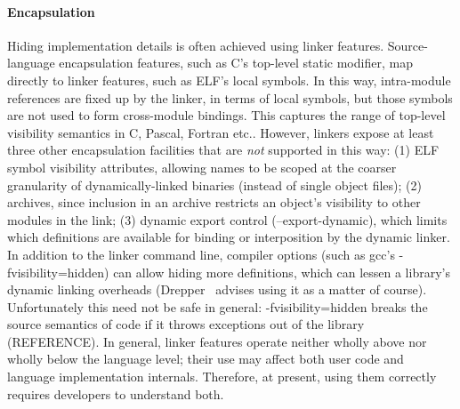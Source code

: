 
\paragraph{Encapsulation}
Hiding implementation details is often achieved using linker features. 
Source-language encapsulation features, such as C's top-level \textsf{static} modifier, 
map directly to linker features, such as ELF's local symbols.
In this way, intra-module references are fixed up by the linker, in terms of local symbols, 
but those symbols are not used to form cross-module bindings.
This captures the range of top-level visibility semantics in C, Pascal, Fortran etc..
However, linkers expose at least three other encapsulation facilities
that are \emph{not} supported in this way: (1) ELF symbol visibility attributes,
allowing names to be scoped at the coarser granularity of 
dynamically-linked binaries (instead of single object files);
(2) archives,
since inclusion in an archive restricts an object's visibility 
to other modules in the link;
(3) dynamic export control (\textsf{--export-dynamic}), which limits 
which definitions are available for binding or interposition by the dynamic linker.
In addition to the linker command line, 
compiler options (such as \textsf{gcc}'s \textsf{-fvisibility=hidden})
can allow hiding more definitions,
which can lessen a library's dynamic linking overheads
(Drepper~\citet{drepper} advises using it as a matter of course).
Unfortunately this need not be safe in general: \textsf{-fvisibility=hidden}
breaks the source semantics of \Cplusplus{} code if it throws exceptions 
out of the library (REFERENCE).
In general, linker features operate neither wholly above nor wholly below the language level; 
their use may affect both user code and language implementation internals.
Therefore, at present, using them correctly requires developers to understand both.

